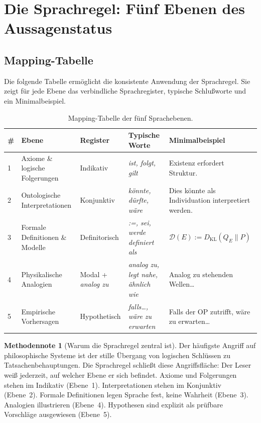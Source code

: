 \documentclass[11pt,a4paper]{article}
\theoremstyle{plain}
\theoremstyle{definition}
\newtheorem{methodennote}{Methodennote}[section]
\begin{document}
\section{Die Sprachregel: F\"{u}nf Ebenen des Aussagenstatus}

\subsection{Mapping-Tabelle}

Die folgende Tabelle erm\"{o}glicht die konsistente Anwendung der Sprachregel.
Sie zeigt f\"{u}r jede Ebene das verbindliche Sprachregister, typische
Schlu\ss{}worte und ein Minimalbeispiel.

\begin{table}[h!]
\centering\small
\begin{tabular}{p{0.4cm}p{3.0cm}p{2.8cm}p{2.5cm}p{4.5cm}}
  \toprule
  \textbf{\#} & \textbf{Ebene} & \textbf{Register} &
  \textbf{Typische Worte} & \textbf{Minimalbeispiel} \\
  \midrule
  1 & Axiome \& logische Folgerungen &
    Indikativ &
    \emph{ist, folgt, gilt} &
    \glqq{}Existenz erfordert Struktur.\grqq{} \\[4pt]
  2 & Ontologische Interpretationen &
    Konjunktiv &
    \emph{k\"{o}nnte, d\"{u}rfte, w\"{a}re} &
    \glqq{}Dies k\"{o}nnte als Individuation interpretiert werden.\grqq{} \\[4pt]
  3 & Formale Definitionen \& Modelle &
    Definitorisch &
    \emph{:=, sei, werde definiert als} &
    \glqq{}$\mathcal{D}(E) := D_{\mathrm{KL}}(Q_E \| P)$\grqq{} \\[4pt]
  4 & Physikalische Analogien &
    Modal + \emph{analog zu} &
    \emph{analog zu, legt nahe, \"{a}hnlich wie} &
    \glqq{}Analog zu stehenden Wellen\ldots\grqq{} \\[4pt]
  5 & Empirische Vorhersagen &
    Hypothetisch &
    \emph{falls\ldots, w\"{a}re zu erwarten} &
    \glqq{}Falls der OP zutrifft, w\"{a}re zu erwarten\ldots\grqq{} \\
  \bottomrule
\end{tabular}
\caption{Mapping-Tabelle der f\"{u}nf Sprachebenen.}
\end{table}

\begin{methodennote}[Warum die Sprachregel zentral ist]
Der h\"{a}ufigste Angriff auf philosophische Systeme ist der stille \"{U}bergang
von logischen Schl\"{u}ssen zu Tatsachenbehauptungen. Die Sprachregel schlie\ss{}t
diese Angriffsfläche: Der Leser wei\ss{} jederzeit, auf welcher Ebene er sich
befindet. Axiome und Folgerungen stehen im Indikativ (Ebene~1). Interpretationen
stehen im Konjunktiv (Ebene~2). Formale Definitionen legen Sprache fest, keine
Wahrheit (Ebene~3). Analogien illustrieren (Ebene~4). Hypothesen sind explizit
als pr\"{u}fbare Vorschl\"{a}ge ausgewiesen (Ebene~5).
\end{methodennote}
\end{document}
